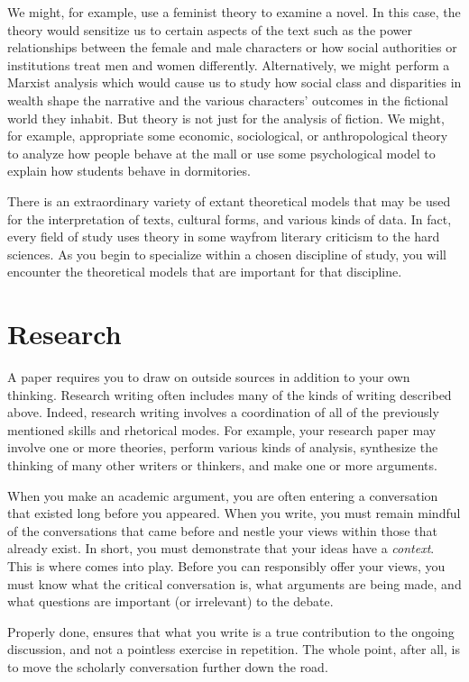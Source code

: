 We might, for example, use a feminist theory to examine a novel. In this case,
the theory would sensitize us to certain aspects of the text such as the power
relationships between the female and male characters or how social authorities
or institutions treat men and women differently. Alternatively, we might perform
a Marxist analysis which would cause us to study how social class and
disparities in wealth shape the narrative and the various characters' outcomes
in the fictional world they inhabit. But theory is not just for the analysis of
fiction. We might, for example, appropriate some economic, sociological, or
anthropological theory to analyze how people behave at the mall or use some
psychological model to explain how students behave in dormitories.

There is an extraordinary variety of extant theoretical models that may be used
for the interpretation of texts, cultural forms, and various kinds of data. In
fact, every field of study uses theory in some way\textemdash from literary
criticism to the hard sciences. As you begin to specialize within a chosen
discipline of study, you will encounter the theoretical models that are
important for that discipline.

\hypertarget{researchessay}{} \section{Research}

A \hyperlink{academicresearch}{\color{Ahrenge}{research}} paper requires you to
draw on outside sources in addition to your own thinking. Research writing often
includes many of the kinds of writing described above. Indeed, research writing
involves a coordination of all of the previously mentioned skills and rhetorical
modes. For example, your research paper may involve one or more theories,
perform various kinds of analysis, synthesize the thinking of many other writers
or thinkers, and make one or more arguments.

When you make an academic argument, you are often entering a conversation that
existed long before you appeared. When you write, you must remain mindful of the
conversations that came before and nestle your views within those that already
exist. In short, you must demonstrate that your ideas have a \emph{context}.
This is where \hyperlink{academicresearch}{\color{Ahrenge}{research}} comes into
play. Before you can responsibly offer your views, you must know what the
critical conversation is, what arguments are being made, and what questions are
important (or irrelevant) to the debate.

Properly done, \hyperlink{academicresearch}{\color{Ahrenge}{research}} ensures
that what you write is a true contribution to the ongoing discussion, and not a
pointless exercise in repetition. The whole point, after all, is to move the
scholarly conversation further down the road.
